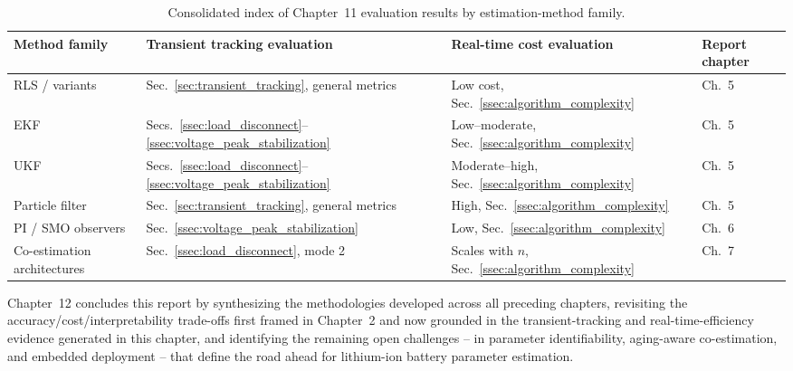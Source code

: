 \begin{table}[htbp]
	\centering
	\caption{Consolidated index of Chapter~11 evaluation results by estimation-method family.}
	\label{tab:ch11_consolidated}
	\begin{tabular}{p{2.8cm}p{3.4cm}p{3.4cm}p{3.0cm}}
		\toprule
		Method family & Transient tracking evaluation & Real-time cost evaluation & Report chapter \\
		\midrule
		RLS / variants & Sec.~\ref{sec:transient_tracking}, general metrics & Low cost, Sec.~\ref{ssec:algorithm_complexity} & Ch.~5 \\
		EKF & Secs.~\ref{ssec:load_disconnect}--\ref{ssec:voltage_peak_stabilization} & Low--moderate, Sec.~\ref{ssec:algorithm_complexity} & Ch.~5 \\
		UKF & Secs.~\ref{ssec:load_disconnect}--\ref{ssec:voltage_peak_stabilization} & Moderate--high, Sec.~\ref{ssec:algorithm_complexity} & Ch.~5 \\
		Particle filter & Sec.~\ref{sec:transient_tracking}, general metrics & High, Sec.~\ref{ssec:algorithm_complexity} & Ch.~5 \\
		PI / SMO observers & Sec.~\ref{ssec:voltage_peak_stabilization} & Low, Sec.~\ref{ssec:algorithm_complexity} & Ch.~6 \\
		Co-estimation architectures & Sec.~\ref{ssec:load_disconnect}, mode 2 & Scales with $n$, Sec.~\ref{ssec:algorithm_complexity} & Ch.~7 \\
		\bottomrule
	\end{tabular}
\end{table}

Chapter~12 concludes this report by synthesizing the methodologies developed across all preceding chapters, revisiting the accuracy/cost/interpretability trade-offs first framed in Chapter~2 and now grounded in the transient-tracking and real-time-efficiency evidence generated in this chapter, and identifying the remaining open challenges -- in parameter identifiability, aging-aware co-estimation, and embedded deployment -- that define the road ahead for lithium-ion battery parameter estimation.
